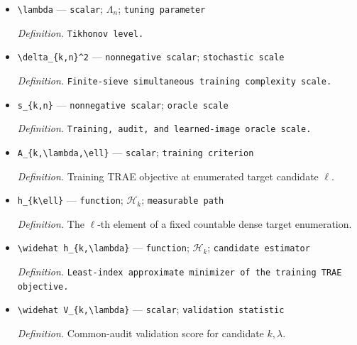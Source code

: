 \documentclass{article}
\begin{document}
\begin{itemize}
  \par\smallskip\noindent\emph{Definition.} \texttt{Geometric Tikhonov grid.}
  \item \texttt{\textbackslash{}\allowbreak{}lambda} --- \texttt{scalar}; \(\Lambda_n\); \texttt{tuning parameter}
  \par\smallskip\noindent\emph{Definition.} \texttt{Tikhonov level.}
  \item \texttt{\textbackslash{}\allowbreak{}delta\_\allowbreak{}\{k,\allowbreak{}n\}\allowbreak{}\textasciicircum{}2} --- \texttt{nonnegative scalar}; \texttt{stochastic scale}
  \par\smallskip\noindent\emph{Definition.} \texttt{Finite-\allowbreak{}sieve simultaneous training complexity scale.}
  \item \texttt{s\_\allowbreak{}\{k,\allowbreak{}n\}\allowbreak{}} --- \texttt{nonnegative scalar}; \texttt{oracle scale}
  \par\smallskip\noindent\emph{Definition.} \texttt{Training,\allowbreak{} audit,\allowbreak{} and learned-\allowbreak{}image oracle scale.}
  \item \texttt{A\_\allowbreak{}\{k,\allowbreak{}\textbackslash{}\allowbreak{}lambda,\allowbreak{}\textbackslash{}\allowbreak{}ell\}\allowbreak{}} --- \texttt{scalar}; \texttt{training criterion}
  \par\smallskip\noindent\emph{Definition.} Training TRAE objective at enumerated target candidate \(\ell\).
  \item \texttt{h\_\allowbreak{}\{k\textbackslash{}\allowbreak{}ell\}\allowbreak{}} --- \texttt{function}; \(\mathcal H_k\); \texttt{measurable path}
  \par\smallskip\noindent\emph{Definition.} The \(\ell\)-th element of a fixed countable dense target enumeration.
  \item \texttt{\textbackslash{}\allowbreak{}widehat h\_\allowbreak{}\{k,\allowbreak{}\textbackslash{}\allowbreak{}lambda\}\allowbreak{}} --- \texttt{function}; \(\mathcal H_k\); \texttt{candidate estimator}
  \par\smallskip\noindent\emph{Definition.} \texttt{Least-\allowbreak{}index approximate minimizer of the training TRAE objective.}
  \item \texttt{\textbackslash{}\allowbreak{}widehat V\_\allowbreak{}\{k,\allowbreak{}\textbackslash{}\allowbreak{}lambda\}\allowbreak{}} --- \texttt{scalar}; \texttt{validation statistic}
  \par\smallskip\noindent\emph{Definition.} Common-audit validation score for candidate \(k,\lambda\).

\end{itemize}
\end{document}
